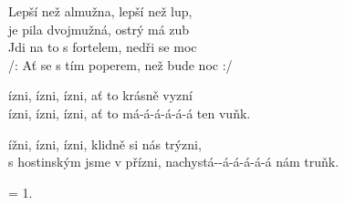 
\ve{}
Lepší než almužna, lepší než lup,\\
je pila dvojmužná, ostrý má zub\\
Jdi na to s fortelem, nedři se moc\\
/: Ať se s tím poperem, než bude noc :/

\cho{}
ízni, ízni, ízni, ať to krásně vyzní\\
ízni, ízni, ízni, a{ť} to má-á-á-á-á-á ten vuňk.

ížni, ízni, ízni, klidně si nás trýzni,\\
s hostinským jsme v p{ř}ízni, nachystá--á-á-á-á-á nám tru{ň}k.

\ve{}
= 1.

\esong{}